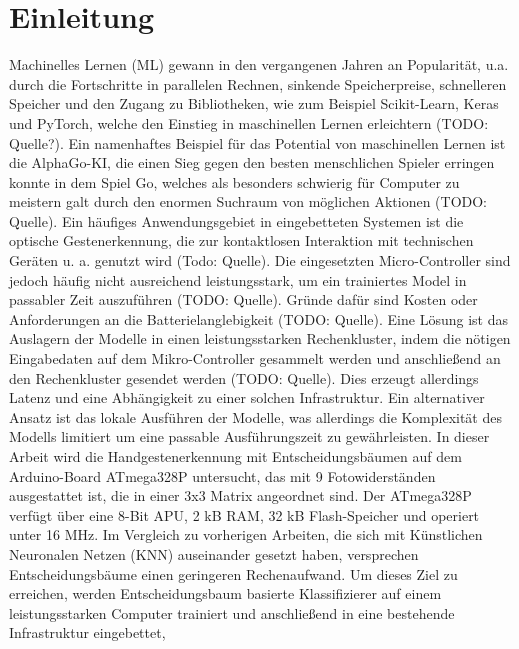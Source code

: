 \chapter{Einleitung}
Machinelles Lernen (ML) gewann in den vergangenen Jahren an Popularität, u.a. durch die Fortschritte in parallelen Rechnen,
sinkende Speicherpreise, schnelleren Speicher und den Zugang zu Bibliotheken, wie zum Beispiel Scikit-Learn, Keras und PyTorch, welche
den Einstieg in maschinellen Lernen erleichtern (TODO: Quelle?).
Ein namenhaftes Beispiel für das Potential von maschinellen Lernen ist die AlphaGo-KI, die einen Sieg gegen den besten menschlichen Spieler
erringen konnte in dem Spiel Go, welches als besonders schwierig für Computer zu meistern galt durch den enormen Suchraum von möglichen Aktionen (TODO: Quelle).
\newline
\newline
Ein häufiges Anwendungsgebiet in eingebetteten Systemen ist die optische Gestenerkennung, die zur kontaktlosen Interaktion mit technischen Geräten u. a. genutzt wird (Todo: Quelle).
Die eingesetzten Micro-Controller sind jedoch häufig nicht ausreichend leistungsstark, um ein trainiertes Model in passabler Zeit auszuführen (TODO: Quelle). Gründe dafür sind
Kosten oder Anforderungen an die Batterielanglebigkeit (TODO: Quelle). Eine Lösung ist das Auslagern der Modelle in einen leistungsstarken Rechenkluster, indem die nötigen Eingabedaten auf dem
Mikro-Controller gesammelt werden und anschließend an den Rechenkluster gesendet werden (TODO: Quelle). Dies erzeugt allerdings Latenz und eine Abhängigkeit zu einer solchen
Infrastruktur. Ein alternativer Ansatz ist das lokale Ausführen der Modelle, was allerdings die Komplexität des Modells limitiert um eine passable Ausführungszeit zu gewährleisten.
\newline
\newline
In dieser Arbeit wird die Handgestenerkennung mit Entscheidungsbäumen auf dem Arduino-Board ATmega328P untersucht, das mit 9 Fotowiderständen ausgestattet ist, die in einer 3x3 Matrix angeordnet sind.
Der ATmega328P verfügt über eine 8-Bit APU, 2 kB RAM, 32 kB Flash-Speicher und operiert unter 16 MHz. Im Vergleich zu vorherigen Arbeiten, die sich mit Künstlichen Neuronalen Netzen (KNN) auseinander
gesetzt haben, versprechen Entscheidungsbäume einen geringeren Rechenaufwand.
\newline
\newline
Um dieses Ziel zu erreichen, werden Entscheidungsbaum basierte Klassifizierer auf einem leistungsstarken Computer trainiert und anschließend in eine bestehende Infrastruktur eingebettet,
